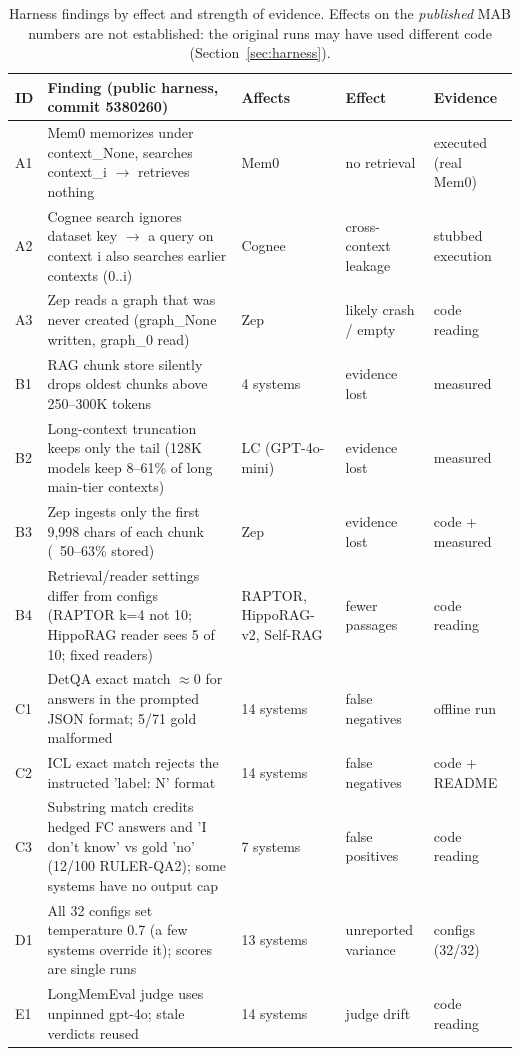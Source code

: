 \begin{table}[t]
\centering\footnotesize
\begin{tabularx}{\linewidth}{@{}l X p{2.2cm} p{2.0cm} p{2.0cm}@{}}
\toprule
ID & Finding (public harness, commit 5380260) & Affects & Effect & Evidence \\
\midrule
A1 & Mem0 memorizes under context\_None, searches context\_i $\rightarrow$ retrieves nothing & Mem0 & no retrieval & executed (real Mem0) \\
A2 & Cognee search ignores dataset key $\rightarrow$ a query on context i also searches earlier contexts (0..i) & Cognee & cross-context leakage & stubbed execution \\
A3 & Zep reads a graph that was never created (graph\_None written, graph\_0 read) & Zep & likely crash / empty & code reading \\
B1 & RAG chunk store silently drops oldest chunks above 250--300K tokens & 4 systems & evidence lost & measured \\
B2 & Long-context truncation keeps only the tail (128K models keep 8--61\% of long main-tier contexts) & LC (GPT-4o-mini) & evidence lost & measured \\
B3 & Zep ingests only the first 9,998 chars of each chunk (~50--63\% stored) & Zep & evidence lost & code + measured \\
B4 & Retrieval/reader settings differ from configs (RAPTOR k=4 not 10; HippoRAG reader sees 5 of 10; fixed readers) & RAPTOR, HippoRAG-v2, Self-RAG & fewer passages & code reading \\
C1 & DetQA exact match $\approx$0 for answers in the prompted JSON format; 5/71 gold malformed & 14 systems & false negatives & offline run \\
C2 & ICL exact match rejects the instructed 'label: N' format & 14 systems & false negatives & code + README \\
C3 & Substring match credits hedged FC answers and 'I don't know' vs gold 'no' (12/100 RULER-QA2); some systems have no output cap & 7 systems & false positives & code reading \\
D1 & All 32 configs set temperature 0.7 (a few systems override it); scores are single runs & 13 systems & unreported variance & configs (32/32) \\
E1 & LongMemEval judge uses unpinned gpt-4o; stale verdicts reused & 14 systems & judge drift & code reading \\
\bottomrule
\end{tabularx}
\caption{Harness findings by effect and strength of evidence. Effects on the \emph{published} MAB numbers are not established: the original runs may have used different code (Section~\ref{sec:harness}).}
\label{tab:harness}
\end{table}
